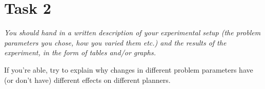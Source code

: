
\section{Task 2}
\begin{framed}\em You should hand in a written description of your experimental setup (the problem parameters you chose, how you varied them etc.) and the results of the experiment, in the form of tables and/or graphs.

If you're able, try to explain why changes in different problem parameters have (or don't have) different effects on different planners.\em\end{framed}

